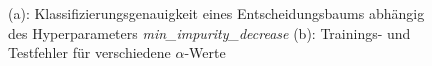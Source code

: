 \begin{figure}[h]
	\centering
	\vspace*{-0.8 cm}
	\hfill
	\caption{(a): Klassifizierungsgenauigkeit eines Entscheidungsbaums abhängig des Hyperparameters \emph{min\_impurity\_decrease} (b): Trainings- und Testfehler für verschiedene $\alpha$-Werte}
\end{figure}



